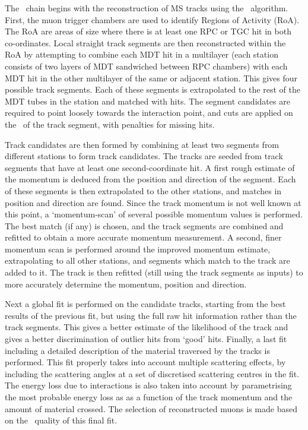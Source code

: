 The \staco\ chain begins with the reconstruction of MS tracks using the \muonboy\
algorithm. First, the muon trigger chambers are used to identify Regions of
Activity (RoA). The RoA are areas of size \deltaetadeltaphi{0.4}{0.4} where
there is at least one RPC or TGC hit in both co-ordinates. Local straight track
segments are then reconstructed within the RoA by attempting to combine each MDT
hit in a multilayer (each station consists of two layers of MDT sandwiched
between RPC chambers) with each MDT hit in the other multilayer of the same or
adjacent station. This gives four possible track segments. Each of these segments
is extrapolated to the rest of the MDT tubes in the station and matched with hits. 
The segment candidates are required to point loosely towards the
interaction point, and cuts are applied on the \chisquared\ of the track
segment, with penalties for missing hits. 

Track candidates are then formed by combining at least
two segments from different stations to form track candidates. The tracks are
seeded from track segments that have at least one second-coordinate hit. A first
rough estimate of the momentum is deduced from the position and direction of the
segment. Each of these segments is then extrapolated to the other stations, and
matches in position and direction are found. Since the track momentum is not well
known at this point, a `momentum-scan' of several possible momentum values is
performed. The best match (if any) is chosen, and the track segments are
combined and refitted to obtain a more accurate momentum measurement. A second,
finer momentum scan is performed around the improved momentum estimate,
extrapolating to all other stations, and segments which match to the track are added to
it.
The track is then refitted (still using the track segments as inputs) to more accurately determine the momentum, position and
direction. 

Next a global fit is performed on the candidate tracks, starting from the
best results of the previous fit, but using the full raw hit information rather
than the track segments. This gives
a better estimate of the likelihood of the track and gives a better
discrimination of outlier hits from `good' hits. Finally, a last fit including
a detailed description of the material traversed by the tracks is performed.
This fit properly takes into account multiple scattering effects, by including
the
scattering angles at a set of discretised scattering centres in the
fit. The energy loss due to interactions is also taken into account  by
parametrising the most probable energy loss as as a function of the track momentum and
the amount of material crossed. The selection of reconstructed muons is made
based on the \chisquared\ quality of this final fit.

